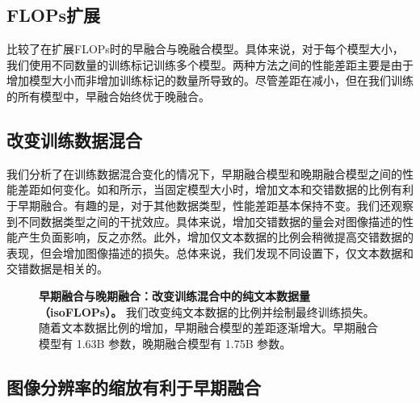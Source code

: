 \subsection{FLOPs扩展}  比较了在扩展FLOPs时的早融合与晚融合模型。具体来说，对于每个模型大小，我们使用不同数量的训练标记训练多个模型。两种方法之间的性能差距主要是由于增加模型大小而非增加训练标记的数量所导致的。尽管差距在减小，但在我们训练的所有模型中，早融合始终优于晚融合。
\subsection{改变训练数据混合} 我们分析了在训练数据混合变化的情况下，早期融合模型和晚期融合模型之间的性能差距如何变化。如和所示，当固定模型大小时，增加文本和交错数据的比例有利于早期融合。有趣的是，对于其他数据类型，性能差距基本保持不变。我们还观察到不同数据类型之间的干扰效应。具体来说，增加交错数据的量会对图像描述的性能产生负面影响，反之亦然。此外，增加仅文本数据的比例会稍微提高交错数据的表现，但会增加图像描述的损失。总体来说，我们发现不同设置下，仅文本数据和交错数据是相关的。

\begin{figure}[htp]
    \centering
    \captionsetup{type=figure}
    \begin{subfigure}[t]{0.33\linewidth}
        
    \end{subfigure}
    \begin{subfigure}[t]{0.32\linewidth}
        
    \end{subfigure}
    \begin{subfigure}[t]{0.32\linewidth}
        
    \end{subfigure}

    \vspace{0.3cm}
    \caption{\textbf{早期融合与晚期融合：改变训练混合中的纯文本数据量（isoFLOPs）。} 我们改变纯文本数据的比例并绘制最终训练损失。随着文本数据比例的增加，早期融合模型的差距逐渐增大。早期融合模型有 1.63B 参数，晚期融合模型有 1.75B 参数。}
    \label{fig:early_vs_late_textratio}
\end{figure}


\subsection{图像分辨率的缩放有利于早期融合}

